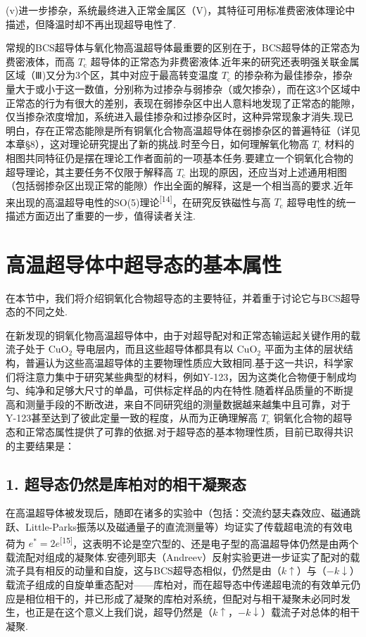 (v)进一步掺杂，系统最终进入正常金属区（V)，其特征可用标准费密液体理论中描述，但降温时却不再出现超导电性了.

常规的BCS超导体与氧化物高温超导体最重要的区别在于，BCS超导体的正常态为费密液体，而高 $T_{\mathrm{c}}$ 超导体的正常态为非费密液体.近年来的研究还表明强关联金属区域（Ⅲ)又分为3个区，其中对应于最高转变温度 $T_{\mathrm{c}}$ 的掺杂称为最佳掺杂，掺杂量大于或小于这一数值，分别称为过掺杂与弱掺杂（或欠掺杂），而在这3个区域中正常态的行为有很大的差别，表现在弱掺杂区中出人意料地发现了正常态的能隙，仅当掺杂浓度增加，系统进入最佳掺杂和过掺杂区时，这种异常现象才消失.现已明白，存在正常态能隙是所有铜氧化合物高温超导体在弱掺杂区的普遍特征（详见本章§8），这对理论研究提出了新的挑战.时至今日，如何理解氧化物高 $T_{\mathrm{c}}$ 材料的相图共同特征仍是摆在理论工作者面前的一项基本任务.要建立一个铜氧化合物的超导理论，其主要任务不仅限于解释高 $T_{\mathrm{c}}$ 出现的原因，还应当对上述通用相图（包括弱掺杂区出现正常的能隙）作出全面的解释，这是一个相当高的要求.近年来出现的高温超导电性的SO(5)理论\textsuperscript{[14]}，在研究反铁磁性与高 $T_{\mathrm{c}}$ 超导电性的统一描述方面迈出了重要的一步，值得读者关注.

\section{高温超导体中超导态的基本属性}

在本节中，我们将介绍铜氧化合物超导态的主要特征，并着重于讨论它与BCS超导态的不同之处.

在新发现的铜氧化物高温超导体中，由于对超导配对和正常态输运起关键作用的载流子处于 $\mathrm{CuO}_{2}$ 导电层内，而且这些超导体都具有以 $\mathrm{CuO}_{2}$ 平面为主体的层状结构，普遍认为这些高温超导体的主要物理性质应大致相同.基于这一共识，科学家们将注意力集中于研究某些典型的材料，例如Y-123，因为这类化合物便于制成均匀、纯净和足够大尺寸的单晶，可供标定样品的内在特性.随着样品质量的不断提高和测量手段的不断改进，来自不同研究组的测量数据越来越集中且可靠，对于Y-123甚至达到了彼此定量一致的程度，从而为正确理解高 $T_{\mathrm{c}}$ 铜氧化合物的超导态和正常态属性提供了可靠的依据.对于超导态的基本物理性质，目前已取得共识的主要结果是：

\subsection*{1. 超导态仍然是库柏对的相干凝聚态}

在高温超导体被发现后，随即在诸多的实验中（包括：交流约瑟夫森效应、磁通跳跃、Little-Parks振荡以及磁通量子的直流测量等）均证实了传载超电流的有效电荷为 $e^{*}=2e$\textsuperscript{[15]}，这表明不论是空穴型的、还是电子型的高温超导体仍然是由两个载流配对组成的凝聚体.安德列耶夫（Andreev）反射实验更进一步证实了配对的载流子具有相反的动量和自旋，这与BCS超导态相似，仍然是由（$k\uparrow$）与（$-k\downarrow$）载流子组成的自旋单重态配对——库柏对，而在超导态中传递超电流的有效单元仍应是相位相干的，并已形成了凝聚的库柏对系统，但配对与相干凝聚未必同时发生，也正是在这个意义上我们说，超导仍然是（$k\uparrow$，$-k\downarrow$）载流子对总体的相干凝聚.

